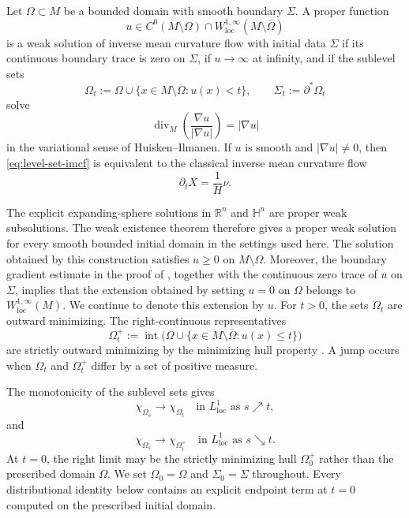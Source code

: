 \documentclass[10pt,a4paper]{amsart}
\numberwithin{equation}{section}
\newcommand{\R}{\mathbb R}
\newcommand{\diver}{\operatorname{div}}
\newcommand{\HH}{\mathbb H}
\begin{document}
Let $\Omega\subset M$ be a bounded domain with smooth boundary $\Sigma$.  A proper function
\begin{equation*}
    u\in C^0(M\setminus\Omega)
      \cap W_{\mathrm{loc}}^{1,\infty}(M\setminus\overline\Omega)
\end{equation*}
is a weak solution of inverse mean curvature flow with initial data $\Sigma$ if its continuous boundary trace is zero on $\Sigma$, if $u\to\infty$ at infinity, and if the sublevel sets
\begin{equation*}
    \Omega_t:=\Omega\cup\{x\in M\setminus\overline\Omega:u(x)<t\},
    \qquad
    \Sigma_t:=\partial^*\Omega_t
\end{equation*}
solve
\begin{equation}\label{eq:level-set-imcf}
    \diver_M\left(\frac{\nabla u}{|\nabla u|}\right)=|\nabla u|
\end{equation}
in the variational sense of Huisken--Ilmanen.  If $u$ is smooth and $|\nabla u|\neq0$, then \eqref{eq:level-set-imcf} is equivalent to the classical inverse mean curvature flow \cite{Gerhardt1990,Gerhardt2011,Urbas1990}
\begin{equation*}
    \partial_t X=\frac{1}{H}\nu.
\end{equation*}

The explicit expanding-sphere solutions in $\R^n$ and $\HH^n$ are proper weak subsolutions.  The weak existence theorem \cite[Theorem~3.1]{HI2001} therefore gives a proper weak solution for every smooth bounded initial domain in the settings used here. The solution obtained by this construction satisfies
$u\geq0$ on $M\setminus\Omega$. Moreover, the boundary gradient estimate in the proof of \cite[Theorem~3.1]{HI2001}, together with the continuous zero trace of $u$ on $\Sigma$, implies that the extension obtained by setting $u=0$ on $\Omega$ belongs to $W_{\mathrm{loc}}^{1,\infty}(M)$. We continue to denote this extension by $u$. For $t>0$, the sets $\Omega_t$ are outward minimizing.  The right-continuous representatives
\begin{equation*}
    \Omega_t^+:=\operatorname{int}\bigl(\Omega\cup\{x\in M\setminus\overline\Omega:u(x)\leq t\}\bigr)
\end{equation*}
are strictly outward minimizing by the minimizing hull property \cite[Minimizing Hull Property~1.4]{HI2001}.  A jump occurs when $\Omega_t$ and $\Omega_t^+$ differ by a set of positive measure.

The monotonicity of the sublevel sets gives
\begin{equation*}
    \chi_{\Omega_s}\longrightarrow\chi_{\Omega_t}
    \quad\text{in }L^1_{\mathrm{loc}}\text{ as }s\nearrow t,
\end{equation*}
and
\begin{equation*}
    \chi_{\Omega_s}\longrightarrow\chi_{\Omega_t^+}
    \quad\text{in }L^1_{\mathrm{loc}}\text{ as }s\searrow t.
\end{equation*}
At $t=0$, the right limit may be the strictly minimizing hull $\Omega_0^+$ rather than the prescribed domain $\Omega$.  We set $\Omega_0=\Omega$ and $\Sigma_0=\Sigma$ throughout.  Every distributional identity below contains an explicit endpoint term at $t=0$ computed on the prescribed initial domain.
\end{document}
